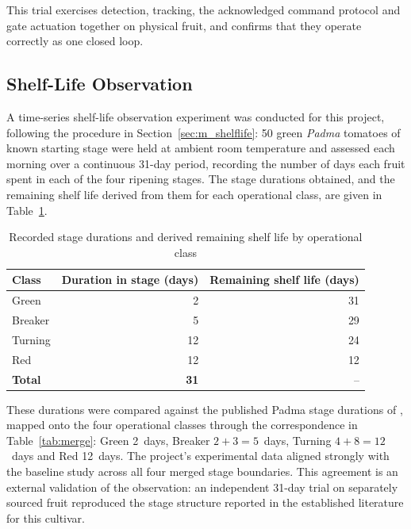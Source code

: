 This trial exercises detection, tracking, the acknowledged command protocol and gate actuation together on physical fruit, and confirms that they operate correctly as one closed loop.

\subsection{Shelf-Life Observation}
\label{sec:r_shelflife}

A time-series shelf-life observation experiment was conducted for this project, following the procedure in Section~\ref{sec:m_shelflife}: 50 green \textit{Padma} tomatoes of known starting stage were held at ambient room temperature and assessed each morning over a continuous 31-day period, recording the number of days each fruit spent in each of the four ripening stages. The stage durations obtained, and the remaining shelf life derived from them for each operational class, are given in Table~\ref{tab:shelfresults}.

\begin{table}[H]
\caption{Recorded stage durations and derived remaining shelf life by operational class}
\label{tab:shelfresults}
\centering
\begin{tabular}{lrr}
\toprule
\textbf{Class} & \textbf{Duration in stage (days)} & \textbf{Remaining shelf life (days)} \\
\midrule
Green   & 2  & 31 \\
Breaker & 5  & 29 \\
Turning & 12 & 24 \\
Red     & 12 & 12 \\
\midrule
\textbf{Total} & \textbf{31} & -- \\
\bottomrule
\end{tabular}
\end{table}

These durations were compared against the published Padma stage durations of \citet{abekoon2024}, mapped onto the four operational classes through the correspondence in Table~\ref{tab:merge}: Green 2~days, Breaker $2+3=5$~days, Turning $4+8=12$~days and Red 12~days. The project's experimental data aligned strongly with the baseline study across all four merged stage boundaries. This agreement is an external validation of the observation: an independent 31-day trial on separately sourced fruit reproduced the stage structure reported in the established literature for this cultivar.

